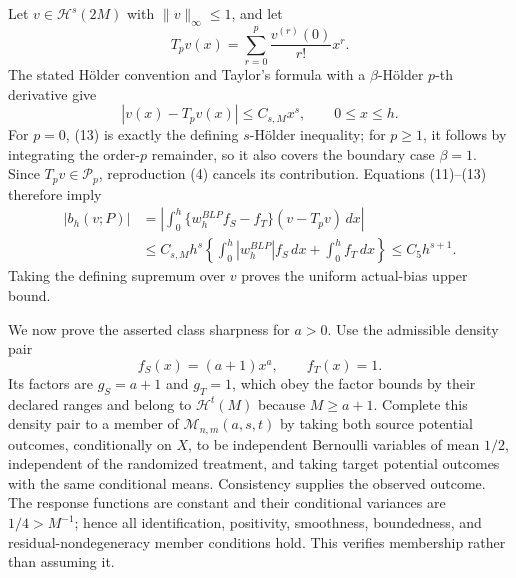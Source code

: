 Let \(v\in\mathcal H^s(2M)\) with \(\|v\|_\infty\le1\), and let
\[
T_pv(x)=\sum_{r=0}^p\frac{v^{(r)}(0)}{r!}x^r.
\tag{12}
\]
The stated Hölder convention and Taylor's formula with a \(\beta\)-Hölder \(p\)-th derivative give
\[
|v(x)-T_pv(x)|\le C_{s,M}x^s,
\qquad 0\le x\le h.
\tag{13}
\]
For \(p=0\), (13) is exactly the defining \(s\)-Hölder inequality; for \(p\ge1\), it follows by integrating the order-\(p\) remainder, so it also covers the boundary case \(\beta=1\).  Since \(T_pv\in\mathcal P_p\), reproduction (4) cancels its contribution.  Equations (11)--(13) therefore imply
\[
\begin{aligned}
|b_h(v;P)|
&=\left|\int_0^h\{w_h^{BLP}f_S-f_T\}(v-T_pv)\,dx\right|\\
&\le C_{s,M}h^s
\left\{\int_0^h|w_h^{BLP}|f_S\,dx+\int_0^hf_T\,dx\right\}
\le C_5h^{s+1}.
\end{aligned}
\tag{14}
\]
Taking the defining supremum over \(v\) proves the uniform actual-bias upper bound.

We now prove the asserted class sharpness for \(a>0\).  Use the admissible density pair
\[
f_S(x)=(a+1)x^a,
\qquad f_T(x)=1.
\tag{15}
\]
Its factors are \(g_S=a+1\) and \(g_T=1\), which obey the factor bounds by their declared ranges and belong to \(\mathcal H^t(M)\) because \(M\ge a+1\).  Complete this density pair to a member of \(\mathcal M_{n,m}(a,s,t)\) by taking both source potential outcomes, conditionally on \(X\), to be independent Bernoulli variables of mean \(1/2\), independent of the randomized treatment, and taking target potential outcomes with the same conditional means.  Consistency supplies the observed outcome.  The response functions are constant and their conditional variances are \(1/4>M^{-1}\); hence all identification, positivity, smoothness, boundedness, and residual-nondegeneracy member conditions hold.  This verifies membership rather than assuming it.

